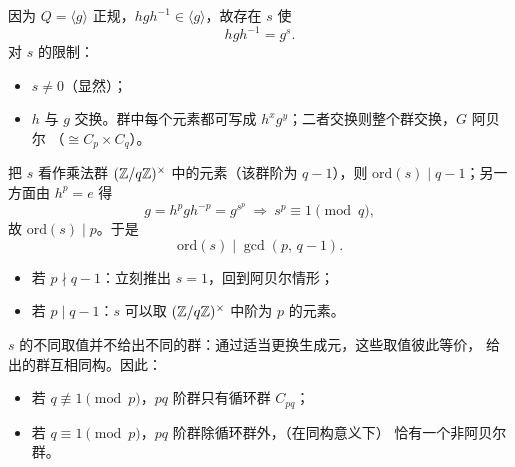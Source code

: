 因为 $Q = \langle g\rangle$ 正规，$hgh^{-1}\in\langle g\rangle$，故存在
$s$ 使
\[
  hgh^{-1} = g^{s}.
\]
对 $s$ 的限制：
\begin{itemize}[leftmargin=1.3em,itemsep=2pt]
  \item $s\ne 0$（显然）；
  \item {}$h$ 与 $g$ 交换。群中每个元素都可写成
        $h^x g^y$；二者交换则整个群交换，$G$ 阿贝尔
        （$\cong C_p\times C_q$）。
\end{itemize}
把 $s$ 看作乘法群 $(\mathbb{Z}/q\mathbb{Z})^\times$ 中的元素（该群阶为 $q-1$），则
$\mathrm{ord}(s)\mid q-1$；另一方面由 $h^p = e$ 得
\[
  g = h^p g h^{-p} = g^{s^p}\ \Longrightarrow\ s^p\equiv 1\pmod q,
\]
故 $\mathrm{ord}(s)\mid p$。于是
\[
  \mathrm{ord}(s)\mid \gcd(p,\,q-1).
\]
\begin{itemize}[leftmargin=1.3em,itemsep=2pt]
  \item 若 $p\nmid q-1$：立刻推出 $s = 1$，回到阿贝尔情形；
  \item 若 $p\mid q-1$：$s$ 可以取 $(\mathbb{Z}/q\mathbb{Z})^\times$ 中阶为 $p$ 的元素。
\end{itemize}

$s$ 的不同取值并不给出不同的群：通过适当更换生成元，这些取值彼此等价，
给出的群互相同构。因此：
\begin{itemize}[leftmargin=1.3em,itemsep=2pt]
  \item 若 $q\not\equiv 1\pmod p$，$pq$ 阶群只有循环群 $C_{pq}$；
  \item 若 $q\equiv 1\pmod p$，$pq$ 阶群除循环群外，（在同构意义下）
        恰有一个非阿贝尔群。
\end{itemize}
